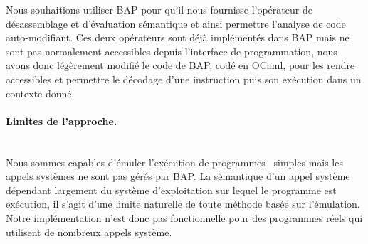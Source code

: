 Nous souhaitions utiliser BAP pour qu'il nous fournisse l'opérateur de désassemblage et d'évaluation sémantique et ainsi permettre l'analyse de code auto-modifiant.
Ces deux opérateurs sont déjà implémentés dans BAP mais ne sont pas normalement accessibles depuis l'interface de programmation, nous avons donc légèrement modifié le code de BAP, codé en OCaml, pour les rendre accessibles et permettre le décodage d'une instruction puis son exécution dans un contexte donné.

\paragraph{Limites de l'approche.}
~\\
Nous sommes capables d'émuler l'exécution de programmes \sms\ simples mais les appels systèmes ne sont pas gérés par BAP.
La sémantique d'un appel système dépendant largement du système d'exploitation sur lequel le programme est exécution, il s'agit d'une limite naturelle de toute méthode basée sur l'émulation.
Notre implémentation n'est donc pas fonctionnelle pour des programmes réels qui utilisent de nombreux appels système.

